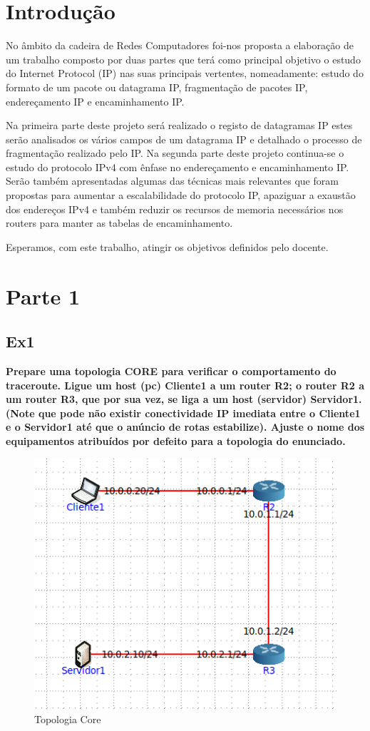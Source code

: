 \documentclass{article}
\begin{document}
\section{Introdução}
	No âmbito da cadeira de Redes Computadores foi-nos proposta a elaboração de um trabalho composto por duas partes que terá como principal objetivo  o estudo do Internet Protocol (IP) nas suas principais vertentes, nomeadamente:  estudo do formato de um pacote ou datagrama IP, fragmentação de pacotes IP, endereçamento IP e  encaminhamento IP.\par
        Na primeira parte deste projeto será realizado o registo de datagramas IP  estes serão analisados os vários campos de um datagrama IP e detalhado o processo de fragmentação realizado pelo IP. Na segunda parte deste projeto continua-se o estudo do protocolo IPv4 com ênfase no endereçamento e encaminhamento IP. Serão também apresentadas algumas das técnicas mais relevantes que foram propostas para aumentar a escalabilidade do protocolo IP, apaziguar a exaustão dos endereços IPv4 e também reduzir os recursos de memoria necessários nos routers para manter as tabelas de encaminhamento.\par
	Esperamos, com este trabalho, atingir os objetivos definidos pelo docente. \\

\section{Parte 1}
\subsection{Ex1}
\textbf{Prepare uma topologia CORE para verificar o comportamento do traceroute. Ligue um host (pc) Cliente1 a um router R2; o router R2 a um router R3, que por sua vez, se liga a um host (servidor) Servidor1. (Note que pode não existir conectividade IP imediata entre o Cliente1 e o Servidor1 até que o anúncio de rotas estabilize). Ajuste o nome dos equipamentos atribuídos por defeito para a topologia do enunciado.}\\\par

\begin{figure}[h]
	\centering
	\includegraphics[scale = 0.8]{topologia-ex1.png}
	\caption{Topologia Core}
\end{figure}
\end{document}
